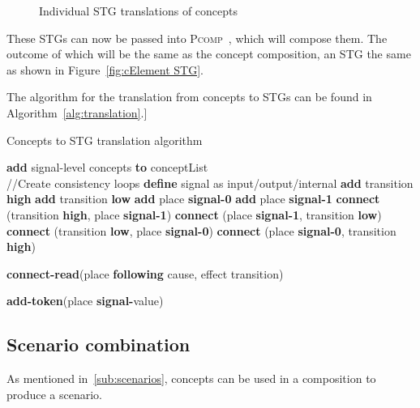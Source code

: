 \documentclass[british,compsoc]{IEEEtran}
\newcommand{\noun}[1]{\textsc{#1}}
\begin{document}
\begin{figure}[h]
\begin{centering}
{}
\par\end{centering}

\protect\caption{\label{fig:IndividConceptStgs}Individual STG translations of concepts}
\end{figure}

These STGs can now be passed into \noun{Pcomp}~\cite{PCOMP}, which will compose them. The outcome of which will be the same as the concept composition, an STG the same as shown in
Figure~\ref{fig:cElement STG}.

The algorithm for the translation from concepts to STGs can be found in Algorithm~\ref{alg:translation}.]

\begin{algorithm}[h]
\begin{algorithmic}
\caption{Concepts to STG translation algorithm \label{alg:translation}}
  \State \textbf{add} signal-level concepts \textbf{to} conceptList
\EndFor \\

//Create consistency loops
  \State \textbf{define} signal as input/output/internal
  \State \textbf{add} transition \textbf{high}
  \State \textbf{add} transition \textbf{low}
  \State \textbf{add} place \textbf{signal-0}
  \State \textbf{add} place \textbf{signal-1}
  \State \textbf{connect} (transition \textbf{high}, place \textbf{signal-1})
  \State \textbf{connect} (place \textbf{signal-1}, transition \textbf{low})
  \State \textbf{connect} (transition \textbf{low}, place \textbf{signal-0})
  \State \textbf{connect} (place \textbf{signal-0}, transition \textbf{high})
\EndFor

  \State \textbf{connect-read}(place \textbf{following} cause, effect transition)
\EndFor

  \State \textbf{add-token}(place \textbf{signal-}value)
\EndFor

\end{algorithmic}
\end{algorithm}

\subsection{Scenario combination\label{sub:scenario-composition}}

As mentioned in~\ref{sub:scenarios}, concepts can be used in a composition to produce a scenario.
\end{document}
